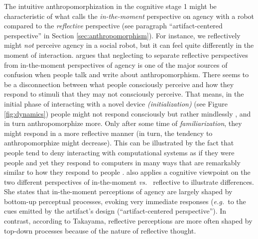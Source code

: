 \documentclass{frontiersSCNS} %
\newcommand{\eg}{{\textit{e.g.~}}}
\newcommand{\vs}{{\textit{vs.~}}}
\begin{document}
The intuitive anthropomorphization in the cognitive stage 1 might be characteristic of what \cite{takayama_perspectives_2012} calls the \textit{in-the-moment} perspective on agency with a robot compared to the \textit{reflective} perspective (see paragraph ``artifact-centered perspective'' in Section \ref{sec:anthropomorphism}). 
For instance, we reflectively
might \textit{not} perceive agency in a social robot, but it can feel quite differently
in the moment of interaction. \cite{takayama_perspectives_2012}
argues that neglecting to separate reflective perspectives from in-the-moment
perspectives of agency is one of the major sources of confusion when people talk
and write about anthropomorphism. There seems to be a disconnection between what
people consciously perceive and how they respond to stimuli that they may not
consciously perceive. That means, in the initial phase of interacting with a
novel device \textit{(initialization)} (see Figure \ref{fig:dynamics}) people might not respond consciously but
rather mindlessly \citep{nass_machines_2000}, and in turn anthropomorphize more.
Only after some time of
\textit{familiarization}, they might respond in a more reflective manner (in turn, the tendency to anthropomorphize might decrease). This
can be illustrated by the fact that people tend to deny interacting with
computational systems as if they were people and yet they respond to computers
in many ways that are remarkably similar to how they respond to people
\citep{reeves_media_1996}. \cite{takayama_perspectives_2012} also applies a
cognitive viewpoint on the two different perspectives of in-the-moment \vs
reflective to illustrate differences. She states that in-the-moment perceptions
of agency are largely shaped by bottom-up perceptual processes, evoking very
immediate responses (\eg to the cues emitted by the artifact's design (``artifact-centered perspective''). In contrast, according to Takayama,
reflective perceptions are more often shaped by top-down processes because of
the nature of reflective thought.



\end{document}

